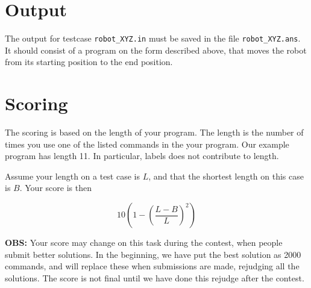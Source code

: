 \section*{Output}
The output for testcase \texttt{robot\_XYZ.in} must be saved in the file \texttt{robot\_XYZ.ans}. It should consist of a program on the form described above, that moves the robot from its starting position to the end position.

\section*{Scoring}
The scoring is based on the length of your program. The length is the number of times you use one of the listed commands in the your program. Our example program has length 11. In particular, labels does not contribute to length.

Assume your length on a test case is $L$, and that the shortest length on this case is $B$. Your score is then

\[ 10 (1 - (\frac{L - B}{L})^2)\]

\textbf{OBS:} Your score may change on this task during the contest, when people submit better solutions. In the beginning, we have put the best solution as 2000 commands, and will replace these when submissions are made, rejudging all the solutions. The score is not final until we have done this rejudge after the contest.
